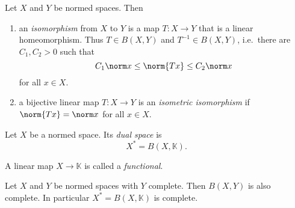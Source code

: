 \documentclass[a4paper]{article}
\newcommand{\K}{{\mathbb{K}}} %
\begin{document}
\begin{definition}
  Let \(X\) and \(Y\) be normed spaces. Then
  \begin{enumerate}
  \item an \emph{isomorphism} from \(X\) to \(Y\) is a map \(T: X \to Y\) that is a linear homeomorphism. Thus \(T \in B(X, Y)\) and \(T^{-1} \in B(X, Y)\), i.e.\ there are \(C_1, C_2 > 0\) such that
    \[
      C_1 \norm x \leq \norm{Tx} \leq C_2 \norm x
    \]
    for all \(x \in X\).
  \item a bijective linear map \(T: X \to Y\) is an \emph{isometric isomorphism} if \(\norm{Tx} = \norm x\) for all \(x \in X\).
  \end{enumerate}

\end{definition}

\begin{definition}
  Let \(X\) be a normed space. Its \emph{dual space} is
  \[
    X^* = B(X, \K).
  \]

  A linear map \(X \to \K\) is called a \emph{functional}.
\end{definition}

\begin{theorem}
  Let \(X\) and \(Y\) be normed spaces with \(Y\) complete. Then \(B(X, Y)\) is also complete. In particular \(X^* = B(X, \K)\) is complete.
\end{theorem}
\end{document}

